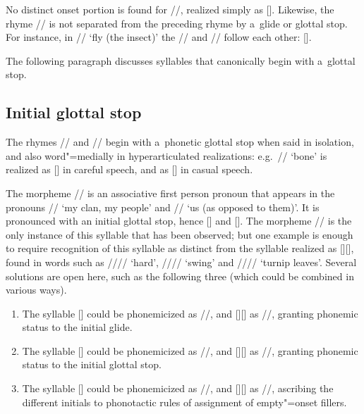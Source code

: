 			No distinct onset portion is found for  //, realized simply as  []. Likewise, the rhyme // is not
			separated from the preceding rhyme by a~glide or glottal stop. For instance, in //
			‘fly (the insect)’ the // and // follow each other: [].
			
			The following paragraph discusses syllables that canonically begin with a~glottal stop. 
				
			
			\subsection{Initial glottal stop}
			\label{sec:hardphoneticonsets}
			
			
			The rhymes // and // begin with a~phonetic glottal stop when said in isolation, and
			also word"=medially in hyperarticulated realizations: e.g.~// ‘bone’ is realized as
			[] in careful speech, and as [] in casual speech.
			
			The morpheme //
            is an {associative} first person pronoun that appears in the pronouns // ‘my clan, my people’ and // ‘us (as opposed to them)’. It
            is pronounced with an initial glottal stop, hence [] and []. The morpheme // is the only instance of this syllable that has been observed; but one example is enough to require recognition of this syllable as distinct from the syllable realized as []{\kern2pt}[], found in words such as //// ‘hard’, //// ‘swing’ and //// ‘turnip leaves’. Several solutions are open here, such as the following three (which could be combined in various ways).
			
			\begin{enumerate}[label=(\roman*)]
				\item The syllable [] could be phonemicized as //, and []{\kern2pt}[\ipa{wu}] as //, granting phonemic status to the initial glide. 
				\item The syllable [] could be phonemicized as //, and []{\kern2pt}[] as //, granting phonemic status to the initial glottal stop. 
				\item The syllable [] could be phonemicized as //, and []{\kern2pt}[] as //, ascribing the different initials to phonotactic rules of assignment of empty"=onset fillers.
			\end{enumerate}
			
